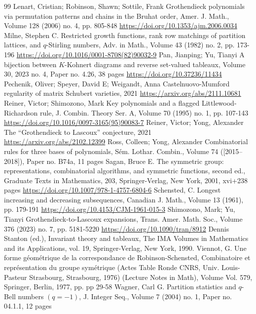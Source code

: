 \documentclass[10pt]{amsart}
\theoremstyle{plain}
\theoremstyle{plain}
\theoremstyle{definition}
\theoremstyle{definition}
\theoremstyle{definition}
\theoremstyle{plain}
\theoremstyle{plain}
\theoremstyle{plain}
\theoremstyle{plain}
\theoremstyle{plain}
\theoremstyle{remark}
\theoremstyle{remark}
\theoremstyle{plain}
\theoremstyle{plain}
\begin{document}
\begin{thebibliography}{99}
 Lenart, Cristian; Robinson, Shawn; Sottile, Frank Grothendieck polynomials via permutation patterns and chains in the Bruhat order, Amer. J. Math., Volume 128 (2006) no. 4, pp. 805-848 \url{https://doi.org/10.1353/ajm.2006.0034}
 Milne, Stephen C. Restricted growth functions, rank row matchings of partition lattices, and $q$-Stirling numbers, Adv. in Math., Volume 43 (1982) no. 2, pp. 173-196 \url{https://doi.org/10.1016/0001-8708(82)90032-9}
 Pan, Jianping; Yu, Tianyi A bijection between $K$-Kohnert diagrams and reverse set-valued tableaux, Volume 30, 2023 no. 4, Paper no. 4.26, 38 pages \url{https://doi.org/10.37236/11434}
 Pechenik, Oliver; Speyer, David E; Weigandt, Anna Castelnuovo-Mumford regularity of matrix Schubert varieties, 2021 \url{https://arxiv.org/abs/2111.10681}
 Reiner, Victor; Shimozono, Mark Key polynomials and a flagged Littlewood-Richardson rule, J. Combin. Theory Ser. A, Volume 70 (1995) no. 1, pp. 107-143 \url{https://doi.org/10.1016/0097-3165(95)90083-7}
 Reiner, Victor; Yong, Alexander The “Grothendieck to Lascoux” conjecture, 2021 \url{https://arxiv.org/abs/2102.12399}
 Ross, Colleen; Yong, Alexander Combinatorial rules for three bases of polynomials, Sém. Lothar. Combin., Volume 74 ([2015–2018]), Paper no. B74a, 11 pages
 Sagan, Bruce E. The symmetric group: representations, combinatorial algorithms, and symmetric functions, second ed., Graduate Texts in Mathematics, 203, Springer-Verlag, New York, 2001, xvi+238 pages \url{https://doi.org/10.1007/978-1-4757-6804-6}
 Schensted, C. Longest increasing and decreasing subsequences, Canadian J. Math., Volume 13 (1961), pp. 179-191 \url{https://doi.org/10.4153/CJM-1961-015-3}
 Shimozono, Mark; Yu, Tianyi Grothendieck-to-Lascoux expansions, Trans. Amer. Math. Soc., Volume 376 (2023) no. 7, pp. 5181-5220 \url{https://doi.org/10.1090/tran/8912}
 Dennis Stanton (ed.), Invariant theory and tableaux, The IMA Volumes in Mathematics and its Applications, vol. 19, Springer-Verlag, New York, 1990.
 Viennot, G. Une forme géométrique de la correspondance de Robinson-Schensted, Combinatoire et représentation du groupe symétrique (Actes Table Ronde CNRS, Univ. Louis-Pasteur Strasbourg, Strasbourg, 1976) (Lecture Notes in Math), Volume Vol. 579, Springer, Berlin, 1977, pp. pp 29-58
 Wagner, Carl G. Partition statistics and $q$-Bell numbers $(q=-1)$, J. Integer Seq., Volume 7 (2004) no. 1, Paper no. 04.1.1, 12 pages
\end{thebibliography}
\end{document}
